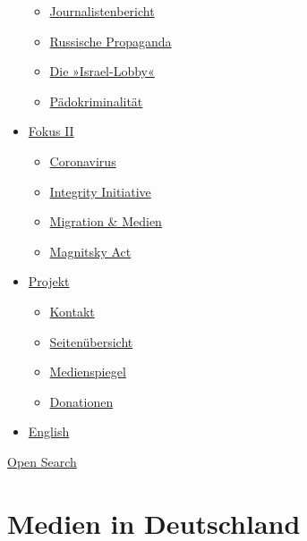 \begin{itemize}
  \begin{itemize}
  \tightlist
  \item
    \href{https://swprs.org/bericht-eines-journalisten/}{Journalistenbericht}
  \item
    \href{https://swprs.org/russische-propaganda/}{Russische Propaganda}
  \item
    \href{https://swprs.org/die-israel-lobby-fakten-und-mythen/}{Die
    »Israel-Lobby«}
  \item
    \href{https://swprs.org/geopolitik-und-paedokriminalitaet/}{Pädokriminalität}
  \end{itemize}
\item
  \href{https://swprs.org/migration-und-medien/}{Fokus II}

  \begin{itemize}
  \tightlist
  \item
    \href{https://swprs.org/covid-19-hinweis-ii/}{Coronavirus}
  \item
    \href{https://swprs.org/die-integrity-initiative/}{Integrity
    Initiative}
  \item
    \href{https://swprs.org/migration-und-medien/}{Migration \& Medien}
  \item
    \href{https://swprs.org/der-fall-magnitsky/}{Magnitsky Act}
  \end{itemize}
\item
  \href{https://swprs.org/kontakt/}{Projekt}

  \begin{itemize}
  \tightlist
  \item
    \href{https://swprs.org/kontakt/}{Kontakt}
  \item
    \href{https://swprs.org/uebersicht/}{Seitenübersicht}
  \item
    \href{https://swprs.org/medienspiegel/}{Medienspiegel}
  \item
    \href{https://swprs.org/donationen/}{Donationen}
  \end{itemize}
\item
  \href{https://swprs.org/contact/}{English}
\end{itemize}

\protect\hyperlink{}{Open Search}

\hypertarget{medien-in-deutschland}{%
\section{Medien in Deutschland}\label{medien-in-deutschland}}

